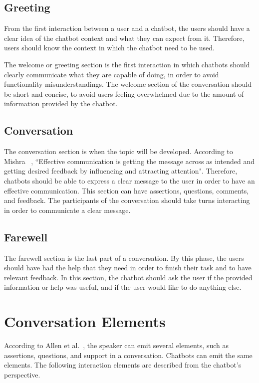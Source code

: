 \documentclass[a4paper,10pt]{article}
\begin{document}
\subsection{Greeting}
From the first interaction between a user and a chatbot, the users should have a clear idea of the chatbot context and what they can expect from it. Therefore, users should know the context in which the chatbot need to be used.

The welcome or greeting section is the first interaction in which chatbots should clearly communicate what they are capable of doing, in order to avoid functionality misunderstandings. 
The welcome section of the conversation should be short and concise, to avoid users feeling overwhelmed due to the amount of information provided by the chatbot. 

\subsection{Conversation}
The conversation section is when the topic will be developed. According to Mishra ~\cite{effectivCommunication}, ``Effective communication is getting the message across as intended and getting desired feedback by influencing and attracting attention". Therefore, chatbots should be able to express a clear message to the user in order to have an effective communication. This section can have assertions, questions, comments, and feedback. The participants of the conversation should take turns interacting in order to communicate a clear message.

\subsection{Farewell}
The farewell section is the last part of a conversation. By this phase, the users should have had the help that they need in order to finish their task and to have relevant feedback. In this section, the chatbot should ask the user if the provided information or help was useful, and if the user would like to do anything else. 

\section{Conversation Elements}
According to Allen et al.~\cite{allen1978conversation}, the speaker can emit several elements, such as assertions, questions, and support in a conversation. Chatbots can emit the same elements. The following interaction elements are described from the chatbot's perspective. 
\end{document}
